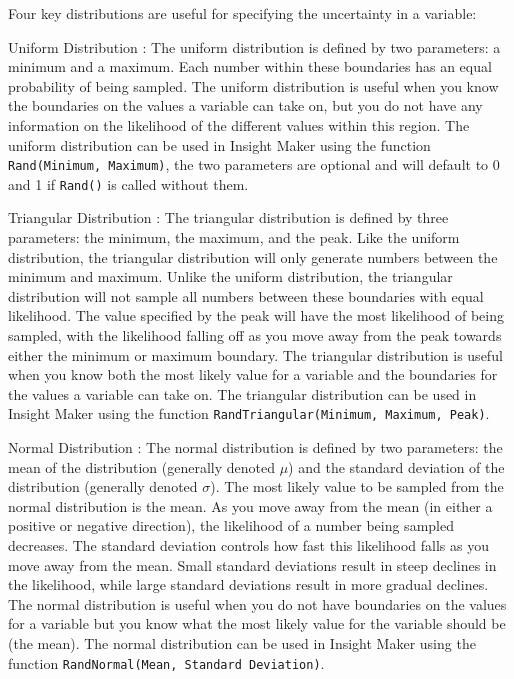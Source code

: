 \documentclass[]{memoir}
\begin{document}
Four key distributions are useful for specifying the uncertainty in a
variable:

Uniform Distribution : The uniform distribution is defined by two
parameters: a minimum and a maximum. Each number within these boundaries
has an equal probability of being sampled. The uniform distribution is
useful when you know the boundaries on the values a variable can take
on, but you do not have any information on the likelihood of the
different values within this region. The uniform distribution can be
used in Insight Maker using the function
\lstinline!Rand(Minimum, Maximum)!, the two parameters are optional and
will default to 0 and 1 if \lstinline!Rand()! is called without them.

Triangular Distribution : The triangular distribution is defined by
three parameters: the minimum, the maximum, and the peak. Like the
uniform distribution, the triangular distribution will only generate
numbers between the minimum and maximum. Unlike the uniform
distribution, the triangular distribution will not sample all numbers
between these boundaries with equal likelihood. The value specified by
the peak will have the most likelihood of being sampled, with the
likelihood falling off as you move away from the peak towards either the
minimum or maximum boundary. The triangular distribution is useful when
you know both the most likely value for a variable and the boundaries
for the values a variable can take on. The triangular distribution can
be used in Insight Maker using the function
\lstinline!RandTriangular(Minimum, Maximum, Peak)!.

Normal Distribution : The normal distribution is defined by two
parameters: the mean of the distribution (generally denoted $\mu$) and
the standard deviation of the distribution (generally denoted $\sigma$).
The most likely value to be sampled from the normal distribution is the
mean. As you move away from the mean (in either a positive or negative
direction), the likelihood of a number being sampled decreases. The
standard deviation controls how fast this likelihood falls as you move
away from the mean. Small standard deviations result in steep declines
in the likelihood, while large standard deviations result in more
gradual declines. The normal distribution is useful when you do not have
boundaries on the values for a variable but you know what the most
likely value for the variable should be (the mean). The normal
distribution can be used in Insight Maker using the function
\lstinline!RandNormal(Mean, Standard Deviation)!.
\end{document}
